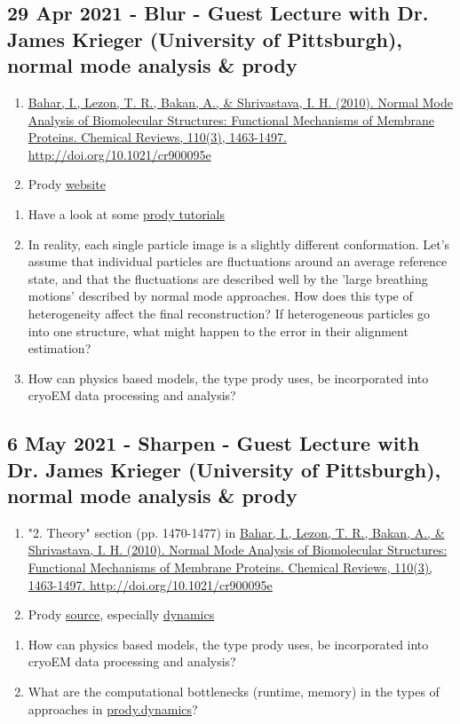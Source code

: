\documentclass[11pt, oneside]{article}   	%
\begin{document}
\subsection{29 Apr 2021 - Blur - Guest Lecture with Dr. James Krieger (University of Pittsburgh), normal mode analysis \& prody}
\begin{enumerate}
	\item \href{https://www.ncbi.nlm.nih.gov/pmc/articles/PMC2836427/}{Bahar, I., Lezon, T. R., Bakan, A., \& Shrivastava, I. H. (2010). Normal Mode Analysis of Biomolecular Structures: Functional Mechanisms of Membrane Proteins. Chemical Reviews, 110(3), 1463-1497. http://doi.org/10.1021/cr900095e}
	\item Prody \href{http://prody.csb.pitt.edu/}{website}
\end{enumerate}
\begin{enumerate}
	\item Have a look at some \href{http://prody.csb.pitt.edu/tutorials/}{prody tutorials}
	\item In reality, each single particle image is a slightly different conformation. Let's assume that individual particles are fluctuations around an average reference state, and that the fluctuations are described well by the 'large breathing motions' described by normal mode approaches. How does this type of heterogeneity affect the final reconstruction? If heterogeneous particles go into one structure, what might happen to the error in their alignment estimation?
	\item How can physics based models, the type prody uses, be incorporated into cryoEM data processing and analysis?
\end{enumerate}

\subsection{6 May 2021 - Sharpen - Guest Lecture with Dr. James Krieger (University of Pittsburgh), normal mode analysis \& prody}
\begin{enumerate}
	\item "2. Theory" section (pp. 1470-1477) in \href{https://www.ncbi.nlm.nih.gov/pmc/articles/PMC2836427/}{Bahar, I., Lezon, T. R., Bakan, A., \& Shrivastava, I. H. (2010). Normal Mode Analysis of Biomolecular Structures: Functional Mechanisms of Membrane Proteins. Chemical Reviews, 110(3), 1463-1497. http://doi.org/10.1021/cr900095e}
	\item Prody \href{https://github.com/prody/ProDy}{source}, especially \href{https://github.com/prody/ProDy/tree/master/prody/dynamics}{dynamics}
\end{enumerate}
\begin{enumerate}
	\item How can physics based models, the type prody uses, be incorporated into cryoEM data processing and analysis?
	\item What are the computational bottlenecks (runtime, memory) in the types of approaches in \href{https://github.com/prody/ProDy/tree/master/prody/dynamics}{prody.dynamics}?
\end{enumerate}
\end{document}
